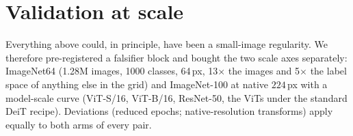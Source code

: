 \section{Validation at scale}\label{sec:scale}

Everything above could, in principle, have been a small-image regularity.
We therefore pre-registered a falsifier block and bought the two scale
axes separately: ImageNet64 (1.28M images, 1000 classes, 64\,px,
13$\times$ the images and 5$\times$ the label space of anything else in
the grid) and ImageNet-100 at native $224$\,px with a model-scale curve
(ViT-S/16, ViT-B/16, ResNet-50, the ViTs under the standard DeiT recipe).
Deviations (reduced epochs; native-resolution transforms) apply equally
to both arms of every pair.

